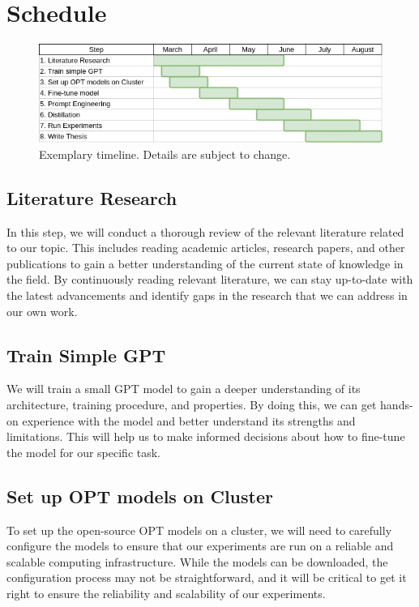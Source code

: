 \documentclass[a4paper,12pt]{article}
\begin{document}
\section{Schedule}
\begin{figure}[ht!]
    \includegraphics[width=\textwidth]{img/thesis_gantt}
    \caption{Exemplary timeline. Details are subject to change.}
\end{figure}


\subsection{Literature Research}
In this step, we will conduct a thorough review of the relevant literature
related to our topic. This includes reading academic articles, research papers,
and other publications to gain a better understanding of the current state of
knowledge in the field. By continuously reading relevant literature, we can
stay up-to-date with the latest advancements and identify gaps in the research
that we can address in our own work.


\subsection{Train Simple GPT}
We will train a small GPT model to gain a deeper understanding of its
architecture, training procedure, and properties. By doing this, we can get
hands-on experience with the model and better understand its strengths and
limitations. This will help us to make informed decisions about how to
fine-tune the model for our specific task.


\subsection{Set up OPT models on Cluster}
To set up the open-source OPT models on a cluster, we will need to carefully
configure the models to ensure that our experiments are run on a reliable and
scalable computing infrastructure. While the models can be downloaded, the
configuration process may not be straightforward, and it will be critical to
get it right to ensure the reliability and scalability of our experiments.
\end{document}
